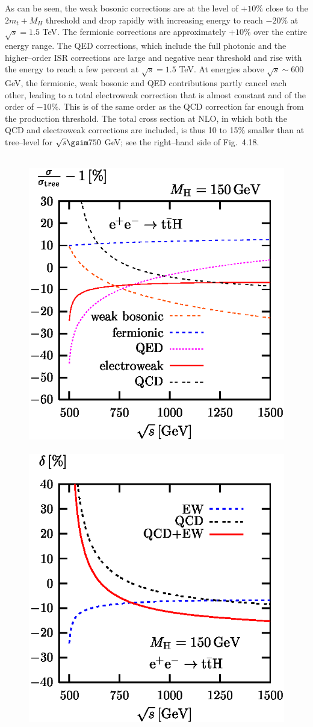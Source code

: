 {As can be seen, the weak bosonic corrections are at the level of
$+10\%$  close to the $2m_t+M_H$ threshold and drop rapidly with increasing
energy to reach $-20\%$ at $\sqrt{s}=1.5$ TeV. The fermionic corrections are
approximately $+10\%$ over the entire energy range.  The QED corrections, which
include the full photonic and the higher--order ISR corrections are large and
negative near threshold and rise with the energy to reach a few percent at
$\sqrt{s}=1.5$ TeV. At energies above $\sqrt{s} \sim 600$ GeV, the fermionic, 
weak bosonic and QED contributions partly cancel each other, leading to a total
electroweak correction that is almost constant and of the order of $-10\%$.
This is of the same order as the QCD correction far enough from the production
threshold.  The total cross section at NLO, in which both the QCD and 
electroweak corrections are included, is thus 10 to 15\% smaller than at 
tree--level for $\sqrt{s}\gsim 750$ GeV; see the right--hand side of 
Fig.~4.18.  

\begin{figure}
\begin{center}
\mbox{
\includegraphics[width=.5\textwidth]{./sm4/ee-ttH-cr1.eps}
\includegraphics[width=.5\textwidth]{./sm4/ee-ttH-cr2.eps} }
\end{center}
\vspace*{1mm}
\end{figure}

}
